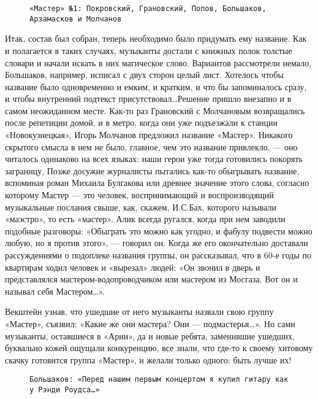 \begin{figure}[h]
    \centering
    \caption{\texttt{«Мастер» №1: Покровский, Грановский, Попов, Большаков, Арзамасков и Молчанов}}
\end{figure}

Итак, состав был собран, теперь необходимо было придумать ему название. Как и полагается в таких случаях, музыканты
достали с книжных полок толстые словари и начали искать в них магическое слово. Вариантов рассмотрели немало, Большаков,
например, исписал с двух сторон целый лист. Хотелось чтобы название было одновременно и емким, и кратким, и что бы
запоминалось сразу, и чтобы внутренний подтекст присутствовал\ldots Решение пришло внезапно и в самом неожиданном месте.
Как-то раз Грановский с Молчановым возвращались после репетиции домой, и в метро, когда они уже подъезжали к станции
«Новокузнецкая», Игорь Молчанов предложил название «Мастер». Никакого скрытого смысла в нем не было, главное, чем это
название привлекло, — оно читалось одинаково на всех языках: наши герои уже тогда готовились покорять заграницу, Позже
досужие журналисты пытались как-то обыгрывать название, вспоминая роман Михаила Булгакова или древнее значение этого
слова, согласно которому Мастер — это человек, воспринимающий и воспроизводящий музыкальные послания свыше, как, скажем,
И.С.Бах, которого называли «маэстро», то есть «мастер». Алик всегда ругался, когда при нем заводили подобные разговоры:
«Обыграть это можно как угодно, и фабулу подвести можно любую, но я против этого», — говорил он. Когда же его
окончательно доставали рассуждениями о подоплеке названия группы, он рассказывал, что в 60-е годы по квартирам ходил
человек и «вырезал» людей: «Он звонил в дверь и представлялся мастером-водопроводчиком или мастером из Мосгаза. Вот он и
называл себя Мастером\ldots».

Векштейн узнав, что ушедшие от него музыканты назвали свою группу «Мастер», съязвил: «Какие же они мастера? Они —
подмастерья\ldots». Но сами музыканты, оставшиеся в «Арии», да и новые ребята, заменившие ушедших, буквально кожей
ощущали конкуренцию, все знали, что где-то к своему хитовому скачку готовится группа «Мастер», и желали только одного:
быть лучше их!

\begin{wrapfigure}{R}{0.5\textwidth}
    \centering
    \caption{\texttt{Большаков: «Перед нашим первым концертом я купил гитару как у Рэнди Роудса\ldots»}}
\end{wrapfigure}

